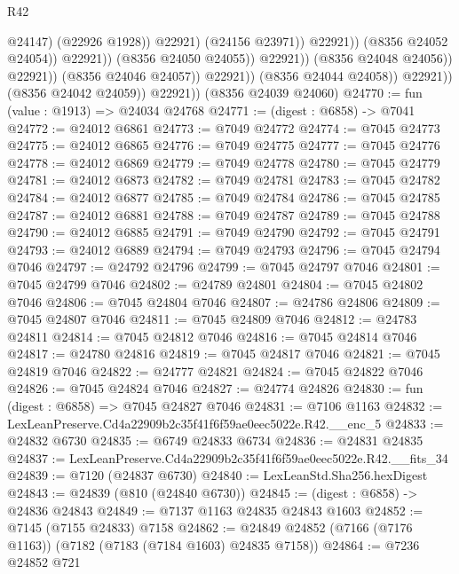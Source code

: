 \begin{lexlean}{R42}
\begin{coremodule}
{                                                    @24147)
                                                  (@22926 @1928))
                                                @22921)
                                              (@24156 @23971))
                                            @22921))
                                        (@8356 @24052 @24054))
                                      @22921))
                                  (@8356 @24050 @24055))
                                @22921))
                            (@8356 @24048 @24056))
                          @22921))
                      (@8356 @24046 @24057))
                    @22921))
                (@8356 @24044 @24058))
              @22921))
          (@8356 @24042 @24059))
        @22921))
    (@8356 @24039 @24060)
@24770 := fun (value : @1913) => @24034 @24768
@24771 := (digest : @6858) -> @7041
@24772 := @24012 @6861
@24773 := @7049 @24772
@24774 := @7045 @24773
@24775 := @24012 @6865
@24776 := @7049 @24775
@24777 := @7045 @24776
@24778 := @24012 @6869
@24779 := @7049 @24778
@24780 := @7045 @24779
@24781 := @24012 @6873
@24782 := @7049 @24781
@24783 := @7045 @24782
@24784 := @24012 @6877
@24785 := @7049 @24784
@24786 := @7045 @24785
@24787 := @24012 @6881
@24788 := @7049 @24787
@24789 := @7045 @24788
@24790 := @24012 @6885
@24791 := @7049 @24790
@24792 := @7045 @24791
@24793 := @24012 @6889
@24794 := @7049 @24793
@24796 := @7045 @24794 @7046
@24797 := @24792 @24796
@24799 := @7045 @24797 @7046
@24801 := @7045 @24799 @7046
@24802 := @24789 @24801
@24804 := @7045 @24802 @7046
@24806 := @7045 @24804 @7046
@24807 := @24786 @24806
@24809 := @7045 @24807 @7046
@24811 := @7045 @24809 @7046
@24812 := @24783 @24811
@24814 := @7045 @24812 @7046
@24816 := @7045 @24814 @7046
@24817 := @24780 @24816
@24819 := @7045 @24817 @7046
@24821 := @7045 @24819 @7046
@24822 := @24777 @24821
@24824 := @7045 @24822 @7046
@24826 := @7045 @24824 @7046
@24827 := @24774 @24826
@24830 := fun (digest : @6858) => @7045 @24827 @7046
@24831 := @7106 @1163
@24832 := LexLeanPreserve.Cd4a22909b2c35f41f6f59ae0eec5022e.R42.__enc_5
@24833 := @24832 @6730
@24835 := @6749 @24833 @6734
@24836 := @24831 @24835
@24837 := LexLeanPreserve.Cd4a22909b2c35f41f6f59ae0eec5022e.R42.__fits_34
@24839 := @7120 (@24837 @6730)
@24840 := LexLeanStd.Sha256.hexDigest
@24843 := @24839 (@810 (@24840 @6730))
@24845 := (digest : @6858) -> @24836 @24843
@24849 := @7137 @1163 @24835 @24843 @1603
@24852 := @7145 (@7155 @24833) @7158
@24862 := @24849 @24852 (@7166 (@7176 @1163)) (@7182 (@7183 (@7184 @1603) @24835 @7158))
@24864 := @7236 @24852 @721
}
\end{coremodule}
\end{lexlean}
